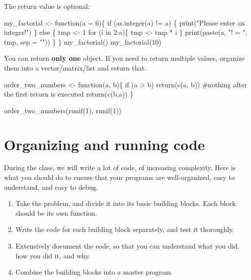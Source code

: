 \documentclass[
  letterpaper,
  DIV=11,
  numbers=noendperiod]{scrreprt}
\newenvironment{Shaded}{\begin{snugshade}}{\end{snugshade}}
\newcommand{\NormalTok}[1]{\textcolor[rgb]{0.00,0.23,0.31}{#1}}
\providecommand{\tightlist}{%
  \setlength{\itemsep}{0pt}\setlength{\parskip}{0pt}}\usepackage{longtable,booktabs,array}
\begin{document}
The return value is optional:

\begin{Shaded}
\begin{Highlighting}[]
\NormalTok{my\_factorial \textless{}{-} function(a = 6)\{}
\NormalTok{  if (as.integer(a) != a) \{}
\NormalTok{    print("Please enter an integer!")}
\NormalTok{  \} else \{}
\NormalTok{    tmp \textless{}{-} 1}
\NormalTok{    for (i in 2:a)\{}
\NormalTok{      tmp \textless{}{-} tmp * i}
\NormalTok{    \}}
\NormalTok{    print(paste(a, "! = ", tmp, sep = ""))}
\NormalTok{  \}}
\NormalTok{\}}
\NormalTok{my\_factorial()}
\NormalTok{my\_factorial(10)}
\end{Highlighting}
\end{Shaded}

You can return \textbf{only one} object. If you need to return multiple
values, organize them into a vector/matrix/list and return that.

\begin{Shaded}
\begin{Highlighting}[]
\NormalTok{order\_two\_numbers \textless{}{-} function(a, b)\{}
\NormalTok{  if (a \textgreater{} b) return(c(a, b)) \#nothing after the first return is executed}
\NormalTok{  return(c(b,a))}
\NormalTok{\}}

\NormalTok{order\_two\_numbers(runif(1), runif(1))}
\end{Highlighting}
\end{Shaded}

\section*{Organizing and running
code}\label{organizing-and-running-code}


During the class, we will write a lot of code, of increasing complexity.
Here is what you should do to ensure that your programs are
well-organized, easy to understand, and easy to debug.

\begin{enumerate}
\def\labelenumi{\arabic{enumi}.}
\tightlist
\item
  Take the problem, and divide it into its basic building blocks. Each
  block should be its own function.
\item
  Write the code for each building block separately, and test it
  thoroughly.
\item
  Extensively document the code, so that you can understand what you
  did, how you did it, and why.
\item
  Combine the building blocks into a master program.
\end{enumerate}
\end{document}
